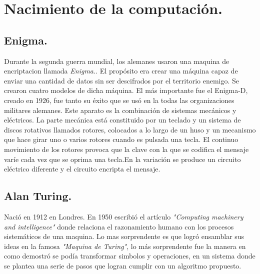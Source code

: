 \documentclass[letterpaper, 12 pt, conference]{ieeeconf}  %
\begin{document}
\section{Nacimiento de la computación. }


\subsection{Enigma.}
Durante la segunda guerra mundial, los alemanes usaron una maquina de encriptacion llamada \textit{ Enigma.}.
El propósito era crear una máquina capaz de enviar una cantidad de datos sin ser descifrados por el territorio enemigo.
Se crearon cuatro modelos de dicha máquina. El más importante fue el Enigma-D, creado en 1926, fue tanto su éxito que se usó en la todas las organizaciones militares alemanes.
Este aparato es la combinación de sistemas mecánicos
y eléctricos. La parte mecánica está constituido por un teclado y un sistema de discos rotativos llamados rotores, colocados a lo largo de un huso y un mecanismo que hace girar uno o varios rotores cuando es pulsada una tecla. El continuo movimiento de los rotores provoca que la clave con la que se codifica el mensaje varíe cada vez que se oprima una tecla.En la variación se produce un circuito eléctrico diferente y el circuito encripta el mensaje.


\subsection{Alan Turing.}
 Nació en 1912 en Londres. En 1950 escribió el artículo \textit{"Computing machinery and intelligence"} donde relaciona el razonamiento humano con los procesos sistemáticos de una maquina. Lo mas sorprendente es que logró ensamblar sus ideas en la famosa \textit{"Maquina de Turing"}, lo más sorprendente fue la manera en como demostró se podía transformar simbolos y operaciones, en un sistema donde se plantea una serie de pasos que logran cumplir con un algoritmo propuesto.\newline
 
 
    \begin{figure}[]
      \centering
      \caption{}
      \label{}
   \end{figure}
\end{document}
